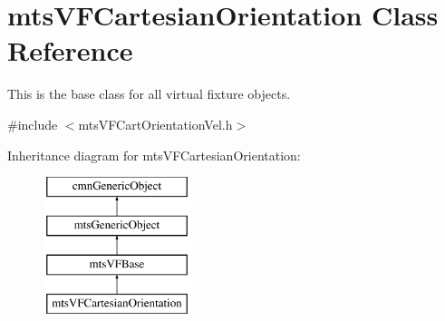 \hypertarget{classmts_v_f_cartesian_orientation}{}\section{mts\+V\+F\+Cartesian\+Orientation Class Reference}
\label{classmts_v_f_cartesian_orientation}


This is the base class for all virtual fixture objects.  




{\ttfamily \#include $<$mts\+V\+F\+Cart\+Orientation\+Vel.\+h$>$}

Inheritance diagram for mts\+V\+F\+Cartesian\+Orientation\+:\begin{figure}[H]
\begin{center}
\leavevmode
\includegraphics[height=4.000000cm]{de/d66/classmts_v_f_cartesian_orientation}
\end{center}
\end{figure}
